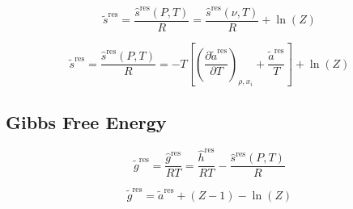 \documentclass[12pt, letterpaper]{article}
\begin{document}

\begin{equation}
    \tilde{s}^{\mathrm{res}} = \frac{\hat{s}^{\mathrm{res}}(P,T)}{R}=\frac{\hat{s}^{\mathrm{res}}(\nu,T)}{R}+\ln(Z)
    \label{eq:s_res_from_s_vol}
\end{equation}


\begin{equation}
    \tilde{s}^{\mathrm{res}} = \frac{\hat{s}^{\mathrm{res}}(P,T)}{R}=-T\left[\left(\frac{\partial\tilde{a}^{\mathrm{res}}}{\partial T}\right)_{\rho,x_{i}}+\frac{\tilde{a}^{\mathrm{res}}}{T}\right]+\ln(Z)
    \label{eq:s_res}
\end{equation}

\subsection{Gibbs Free Energy}


\begin{equation}
    \tilde{g}^{\mathrm{res}}=\frac{\hat{g}^{\mathrm{res}}}{RT}=\frac{\hat{h}^{\mathrm{res}}}{RT}-\frac{\hat{s}^{\mathrm{res}}(P,T)}{R}
    \label{eq:g_res_from_hs}
\end{equation}


\begin{equation}
    \tilde{g}^{\mathrm{res}}=\tilde{a}^{\mathrm{res}}+(Z-1)-\ln(Z)
    \label{eq:g_res_from_ares}
\end{equation}
\end{document}

